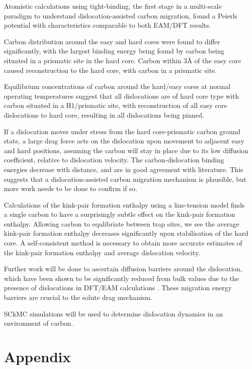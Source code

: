 \documentclass[a4paper,11pt]{article}
\begin{document}
Atomistic calculations using tight-binding, the first stage in a multi-scale paradigm to
understand dislocation-assisted carbon migration, found a Peierls potential with characteristics
comparable to both EAM/DFT results.

Carbon distribution around the easy and hard cores were found to differ
significantly, with the largest binding energy being found by carbon being situated in a prismatic
site in the hard core. Carbon within 3\AA{} of the easy core caused reconstruction to the hard core,
with carbon in a prismatic site.

Equilibrium concentrations of carbon around the hard/easy cores at normal operating temperatures
suggest that all dislocations are of hard core type with carbon situated in a H1/prismatic site, with
reconstruction of all easy core dislocations to hard core, resulting in all dislocations being
pinned.

If a dislocation moves under stress from the hard core-prismatic carbon ground state, a large drag
force acts on the dislocation upon movement to adjacent easy and hard positions, assuming the carbon
will stay in place due to its low diffusion coefficient, relative to dislocation velocity. The
carbon-dislocation binding energies decrease with distance, and are in good agreement with
literature. This suggests that a dislocation-assisted carbon migration mechanism is plausible, but
more work needs to be done to confirm if so.

Calculations of the kink-pair formation enthalpy using a line-tension model finds a
single carbon to have a surprisingly subtle effect on the kink-pair formation
enthalpy. Allowing carbon to equlibriate between trap sites, we see the average
kink-pair formation enthalpy decreases significantly upon stabilisation of the hard
core. A self-consistent method is necessary to obtain more accurate estimates of the
kink-pair formation enthalpy and average dislocation velocity.

Further work will be done to ascertain diffusion barriers around the dislocation, which have been
shown to be significantly reduced from bulk values due to the presence of dislocations in DFT/EAM
calculations \cite{Nematollahi2016}. These migration energy barriers are crucial to the solute drag mechanism.

SCkMC simulations will be used to determine dislocation dynamics in an environment of carbon.


\section{Appendix}
\label{sec:org02e73c8}
\end{document}
